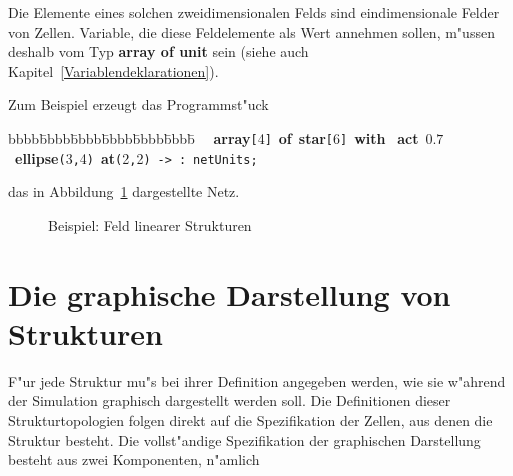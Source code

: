 \begin{center}
\end{center}

Die Elemente eines solchen zweidimensionalen Felds sind
eindimensionale Felder von Zellen. Variable, die diese Feldelemente
als Wert annehmen sollen, m"ussen deshalb vom Typ {\bf array of unit}
sein (siehe auch Kapitel~\ref{Variablendeklarationen}).

Zum Beispiel erzeugt das Programmst"uck
\begin{tabbing}bbbb\=bbbb\=bbbb\=bbbb\=bbbb\=bbbb\=\kill
~~{\bf array}\verb&[&4\verb&]&~{\bf of}~{\bf star}\verb&[&6\verb&]&~{\bf with}~{\bf
act}~$0.7$~{\bf ellipse}\verb&(&3\verb&,&4\verb&)&~{\bf at}\verb&(&2\verb&,&2\verb&)&~\verb&->&~\verb&:&~\verb&netUnits&\verb&;&\\
\end{tabbing}
das in Abbildung~\ref{ArrayStar} dargestellte Netz.

\begin{figure}[htbp]
  \begin{center}
      \begin{minipage}{\textwidth}
      \end{minipage}
    \caption{\label{ArrayStar} Beispiel: Feld linearer Strukturen}
  \end{center}
\end{figure}



\section{Die graphische Darstellung von Strukturen}
\label{StrukturTopologie}

F"ur jede Struktur mu"s bei
ihrer Definition angegeben werden, wie sie w"ahrend der Simulation
graphisch dargestellt
werden soll.  Die Definitionen dieser Strukturtopologien folgen direkt
auf die Spezifikation der Zellen, aus denen die Struktur besteht. Die
vollst"andige Spezifikation der graphischen Darstellung besteht aus zwei Komponenten,
n"amlich

